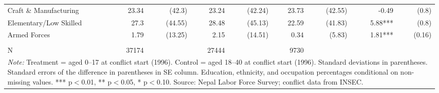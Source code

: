 \begin{landscape}
\begin{table}[!h]
{\begin{tabular}[t]{lrrrrrrrr}
Craft \& Manufacturing & 23.34 & (42.3) & 23.24 & (42.24) & 23.73 & (42.55) & -0.49 & (0.8)\\
\addlinespace
Elementary/Low Skilled & 27.3 & (44.55) & 28.48 & (45.13) & 22.59 & (41.83) & 5.88*** & (0.8)\\
Armed Forces & 1.79 & (13.25) & 2.15 & (14.51) & 0.34 & (5.83) & 1.81*** & (0.16)\\
 &  &  &  &  &  &  &  & \\
N & 37174 &  & 27444 &  & 9730 &  &  & \\
\bottomrule
\multicolumn{9}{l}{\rule{0pt}{1em}\textit{Note: } Treatment = aged 0--17 at conflict start (1996). Control = aged 18--40 at conflict start (1996). Standard deviations in parentheses. Standard errors of the difference in parentheses in SE column. Education, ethnicity, and occupation percentages conditional on non-missing values. *** p$<$0.01, ** p$<$0.05, * p$<$0.10. Source: Nepal Labor Force Survey; conflict data from INSEC.}\\
\end{tabular}}
\end{table}
\end{landscape}
